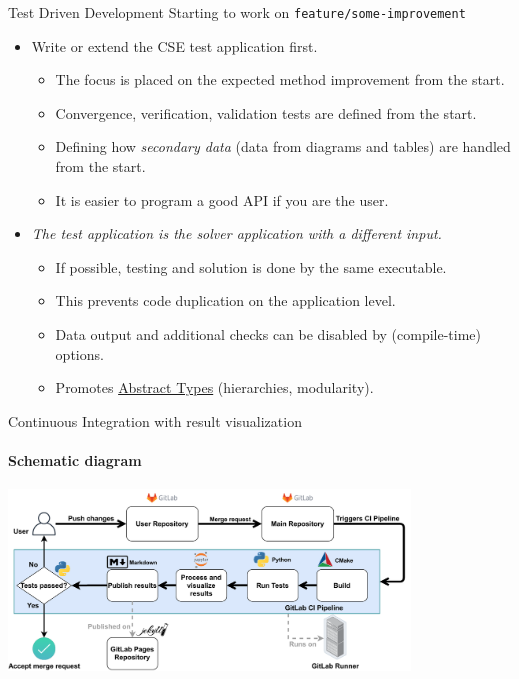 \documentclass[
	ngerman,%
	aspectratio=169,%
	color={accentcolor=2d},
	logo=true,%
	colorframetitle=true,%
	]{tudabeamer}
\begin{document}
\begin{frame}{Test Driven Development} 
	\vfill
	Starting to work on \texttt{feature/some-improvement} 
	\begin{itemize}
		\item Write or extend the CSE test application first. 
			\begin{itemize}
				\item The focus is placed on the expected method improvement from the start. 
				\item Convergence, verification, validation tests are defined from the start.
				\item Defining how \emph{secondary data} (data from diagrams and tables) are handled from the start.  
				\item It is easier to program a good API if you are the user. 
			\end{itemize}
		\item \emph{The test application is the solver application with a different input.}
			\begin{itemize}
				\item If possible, testing and solution is done by the same executable.  
				\item This prevents code duplication on the application level. 
				\item Data output and additional checks can be disabled by (compile-time) options.
				\item Promotes \href{https://en.wikipedia.org/wiki/Abstract_type}{Abstract Types} (hierarchies, modularity).
			\end{itemize}
	\end{itemize}

\end{frame}

\begin{frame}{Continuous Integration with result visualization} 
	\framesubtitle{Schematic diagram}

	\centering
	\includegraphics[width=0.8\textwidth]{figures/ZINF-CI-diagram.pdf}

\end{frame}
\end{document}

